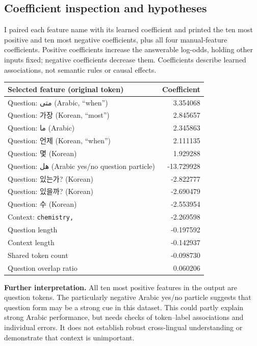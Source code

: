 \documentclass[11pt,a4paper]{article}
\newcommand{\AR}[1]{{\arabicfont\beginR #1\endR}}
\newcommand{\KO}[1]{{\koreanfont #1}}
\begin{document}
\subsection{Coefficient inspection and hypotheses}
I paired each feature name with its learned coefficient and printed the ten most positive and ten most negative coefficients, plus all four manual-feature coefficients. Positive coefficients increase the answerable log-odds, holding other inputs fixed; negative coefficients decrease them. Coefficients describe learned associations, not semantic rules or causal effects.

\begin{center}
\small
\begin{tabular}{lr}
\toprule
Selected feature (original token) & Coefficient \\
\midrule
Question: \AR{متى} (Arabic, ``when'') & 3.354068 \\
Question: \KO{가장} (Korean, ``most'') & 2.845657 \\
Question: \AR{ما} (Arabic) & 2.345863 \\
Question: \KO{언제} (Korean, ``when'') & 2.111135 \\
Question: \KO{몇} (Korean) & 1.929288 \\
Question: \AR{هل} (Arabic yes/no question particle) & -13.729928 \\
Question: \KO{있는가?} (Korean) & -2.822777 \\
Question: \KO{있을까?} (Korean) & -2.690479 \\
Question: \KO{수} (Korean) & -2.553954 \\
Context: \texttt{chemistry,} & -2.269598 \\
\midrule
Question length & -0.197592 \\
Context length & -0.142937 \\
Shared token count & -0.098730 \\
Question overlap ratio & 0.060206 \\
\bottomrule
\end{tabular}
\end{center}

\textbf{Further interpretation.} All ten most positive features in the output are question tokens. The particularly negative Arabic yes/no particle suggests that question form may be a strong cue in this dataset. This could partly explain strong Arabic performance, but needs checks of token--label associations and individual errors. It does not establish robust cross-lingual understanding or demonstrate that context is unimportant.
\end{document}

